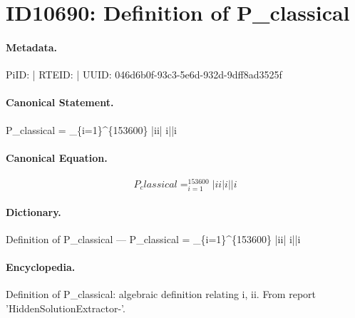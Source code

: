 \section*{ID10690: Definition of P\_classical}
\paragraph{Metadata.}
PiID:  | RTEID:  | UUID: 046d6b0f-93c3-5e6d-932d-9dff8ad3525f

\paragraph{Canonical Statement.}
P\_classical = \_\{i=1\}\textasciicircum{}\{153600\} |ii| i||i

\paragraph{Canonical Equation.}
\[
P_classical = _{i=1}^{153600} |ii|  i||i
\]

\paragraph{Dictionary.}
Definition of P\_classical — P\_classical = \_\{i=1\}\textasciicircum{}\{153600\} |ii|  i||i

\paragraph{Encyclopedia.}
Definition of P\_classical: algebraic definition relating i, ii. From report 'HiddenSolutionExtractor-'.
